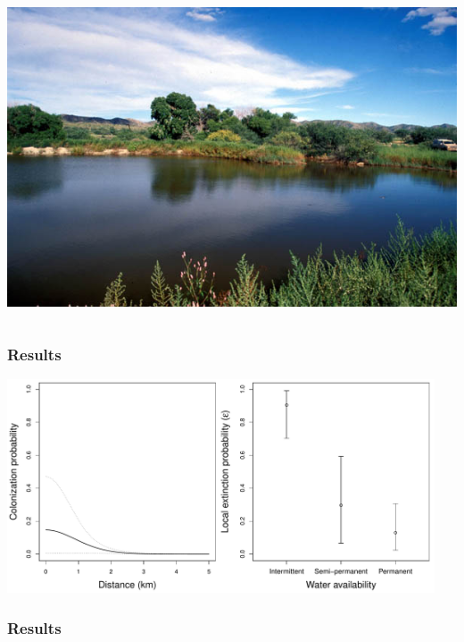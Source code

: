 \documentclass[color=usenames,dvipsnames]{beamer}\usepackage[]{graphicx}\usepackage[]{color}
\begin{document}
\begin{frame}
\begin{columns}
\begin{column}{0.5\textwidth}
      \includegraphics[width=\textwidth]{figs/Carpenter}
    \end{column}
  \end{columns}
\end{frame}




\begin{frame}
  \frametitle{Results}
  \includegraphics[width=0.95\textwidth]{figs/col-ext} \\
\end{frame}



\begin{frame}
  \frametitle{Results}
  \begin{columns}
    \begin{column}{\textwidth}
      \centering
       \\
    \end{column}
  \end{columns}
\end{frame}
\end{document}
